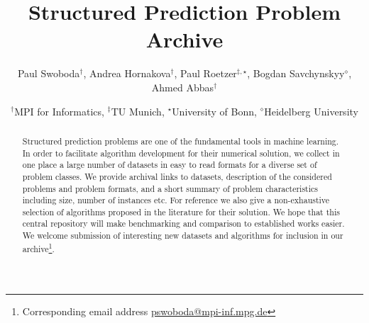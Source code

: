 \documentclass[twocolumn]{article}
\title{Structured Prediction Problem Archive}
\author{Paul Swoboda$^\dagger$, Andrea Hornakova$^\dagger$, Paul Roetzer$^{\ddagger,\star}$, Bogdan Savchynskyy$^{\diamond}$, Ahmed Abbas$^\dagger$}
\date{%
$^\dagger$MPI for Informatics, %
$^\ddagger$TU Munich, %
$^\star$University of Bonn, %
$^\diamond$Heidelberg University %
}
\begin{document}
\maketitle

\begin{abstract}
Structured prediction problems are one of the fundamental tools in machine learning.
In order to facilitate algorithm development for their numerical solution, we collect in one place a large number of datasets in easy to read formats for a diverse set of problem classes.
We provide archival links to datasets, description of the considered problems and problem formats, and a short summary of problem characteristics including size, number of instances etc.
For reference we also give a non-exhaustive selection of algorithms proposed in the literature for their solution.
We hope that this central repository will make benchmarking and comparison to established works easier.
    We welcome submission of interesting new datasets and algorithms for inclusion in our archive\footnote{Corresponding email address \href{mailto:pswoboda@mpi-inf.mpg.de}{pswoboda@mpi-inf.mpg.de}}.
\end{abstract}

\tableofcontents

\clearpage



\clearpage

\clearpage

%
\clearpage

\clearpage

\clearpage

\clearpage

\clearpage

\clearpage

\clearpage

\clearpage

\clearpage

\clearpage


{\small


} 

\end{document}

